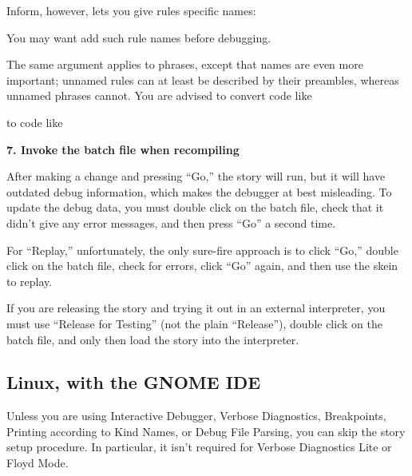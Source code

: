 \documentclass{book}
\newcommand{\lastpagebreak}{\vfill\pagebreak}
\begin{document}
\begin{quote}
  
\end{quote}

Inform, however, lets you give rules specific names:

\begin{quote}
  
\end{quote}

You may want add such rule names before debugging.

The same argument applies to phrases, except that names are even more important;
unnamed rules can at least be described by their preambles, whereas unnamed
phrases cannot.  You are advised to convert code like

\begin{quote}
  
\end{quote}

to code like

\begin{quote}
  
\end{quote}

\textbf{7. Invoke the batch file when recompiling}

After making a change and pressing ``Go,'' the story will run, but it will have
outdated debug information, which makes the debugger at best misleading.  To
update the debug data, you must double click on the batch file, check that it
didn't give any error messages, and then press ``Go'' a second time.

For ``Replay,'' unfortunately, the only sure-fire approach is to click ``Go,''
double click on the batch file, check for errors, click ``Go'' again, and then
use the skein to replay.

If you are releasing the story and trying it out in an external interpreter, you
must use ``Release for Testing'' (not the plain ``Release''), double click on
the batch file, and only then load the story into the interpreter.

\lastpagebreak

\subsection{Linux, with the GNOME IDE}

Unless you are using Interactive Debugger, Verbose Diagnostics, Breakpoints,
Printing according to Kind Names, or Debug File Parsing, you can skip the story
setup procedure.  In particular, it isn't required for Verbose Diagnostics Lite
or Floyd Mode.
\end{document}

